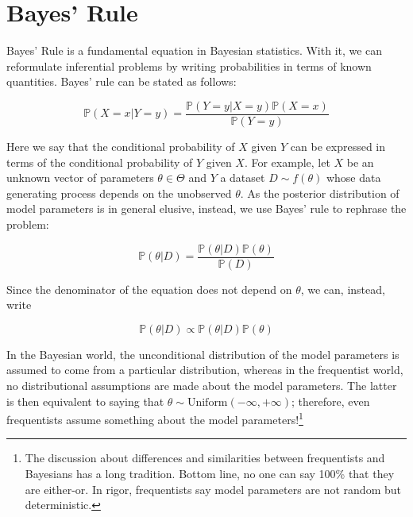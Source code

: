 \documentclass[
]{book}
\begin{document}
\hypertarget{bayes-rule}{%
\chapter{Bayes' Rule}\label{bayes-rule}}

Bayes' Rule is a fundamental equation in Bayesian statistics. With it, we can reformulate inferential problems by writing probabilities in terms of known quantities. Bayes' rule can be stated as follows:

\begin{equation}
\mathbb{P}{\left(X=x|Y=y\right)} = \frac{\mathbb{P}{\left(Y=y|X=y\right)}\mathbb{P}{\left(X=x\right)}}{\mathbb{P}{\left(Y=y\right)}}
\end{equation}

Here we say that the conditional probability of \(X\) given \(Y\) can be expressed in terms of the conditional probability of \(Y\) given \(X\). For example, let \(X\) be an unknown vector of parameters \(\theta\in\Theta\) and \(Y\) a dataset \(D \sim f(\theta)\) whose data generating process depends on the unobserved \(\theta\). As the posterior distribution of model parameters is in general elusive, instead, we use Bayes' rule to rephrase the problem:

\begin{equation*}
\mathbb{P}{\left(\theta|D\right)} = \frac{\mathbb{P}{\left(\theta|D\right)}\mathbb{P}{\left(\theta\right)}}{\mathbb{P}{\left(D\right)}}
\end{equation*}

Since the denominator of the equation does not depend on \(\theta\), we can, instead, write

\begin{equation*}
\mathbb{P}{\left(\theta|D\right)} \propto \mathbb{P}{\left(\theta|D\right)}\mathbb{P}{\left(\theta\right)}
\end{equation*}

In the Bayesian world, the unconditional distribution of the model parameters is assumed to come from a particular distribution, whereas in the frequentist world, no distributional assumptions are made about the model parameters. The latter is then equivalent to saying that \(\theta\sim \mbox{Uniform}(-\infty, +\infty)\); therefore, even frequentists assume something about the model parameters!\footnote{The discussion about differences and similarities between frequentists and Bayesians has a long tradition. Bottom line, no one can say 100\% that they are either-or. In rigor, frequentists say model parameters are not random but deterministic.}
\end{document}
